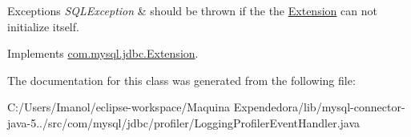 \begin{DoxyExceptions}{Exceptions}
{\em S\+Q\+L\+Exception} & should be thrown if the the \mbox{\hyperlink{interfacecom_1_1mysql_1_1jdbc_1_1_extension}{Extension}} can not initialize itself. \\
\hline
\end{DoxyExceptions}


Implements \mbox{\hyperlink{interfacecom_1_1mysql_1_1jdbc_1_1_extension_a79427811058193260bd4df0c38414e88}{com.\+mysql.\+jdbc.\+Extension}}.



The documentation for this class was generated from the following file\+:\begin{DoxyCompactItemize}
\item 
C\+:/\+Users/\+Imanol/eclipse-\/workspace/\+Maquina Expendedora/lib/mysql-\/connector-\/java-\/5../src/com/mysql/jdbc/profiler/Logging\+Profiler\+Event\+Handler.\+java\end{DoxyCompactItemize}

